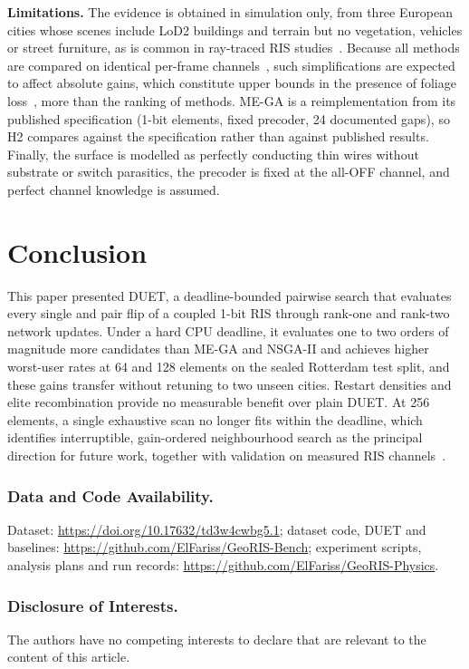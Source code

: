 \documentclass[runningheads]{llncs}
\newcommand{\duet}{\mbox{DUET}}\newcommand{\duetD}{\mbox{DUET-D}}\newcommand{\duetE}{\mbox{DUET-E}}
\begin{document}
\textbf{Limitations.} The evidence is obtained in simulation only, from three European cities whose scenes include LoD2 buildings and terrain but no vegetation, vehicles or street furniture, as is common in ray-traced RIS studies~\cite{peng2025risnet,alkhateeb2019deepmimo,hoydis2023sionna}. Because all methods are compared on identical per-frame channels~\cite{glasserman1992crn}, such simplifications are expected to affect absolute gains, which constitute upper bounds in the presence of foliage loss~\cite{itu2021p833,alnuaimi1998vegetation}, more than the ranking of methods. ME-GA is a reimplementation from its published specification (1-bit elements, fixed precoder, 24 documented gaps), so H2 compares against the specification rather than against published results. Finally, the surface is modelled as perfectly conducting thin wires without substrate or switch parasitics, the precoder is fixed at the all-OFF channel, and perfect channel knowledge is assumed.

\section{Conclusion}
This paper presented \duet{}, a deadline-bounded pairwise search that evaluates every single and pair flip of a coupled 1-bit RIS through rank-one and rank-two network updates. Under a hard CPU deadline, it evaluates one to two orders of magnitude more candidates than ME-GA and NSGA-II and achieves higher worst-user rates at 64 and 128 elements on the sealed Rotterdam test split, and these gains transfer without retuning to two unseen cities. Restart densities and elite recombination provide no measurable benefit over plain \duet{}. At 256 elements, a single exhaustive scan no longer fits within the deadline, which identifies interruptible, gain-ordered neighbourhood search as the principal direction for future work, together with validation on measured RIS channels~\cite{tewes2023comprehensive,piana2026brisc}.

\subsubsection*{Data and Code Availability.} Dataset: \url{https://doi.org/10.17632/td3w4cwbg5.1}; dataset code, \duet{} and baselines: \url{https://github.com/ElFariss/GeoRIS-Bench}; experiment scripts, analysis plans and run records: \url{https://github.com/ElFariss/GeoRIS-Physics}.

\subsubsection*{Disclosure of Interests.} The authors have no competing interests to declare that are relevant to the content of this article.



\end{document}
